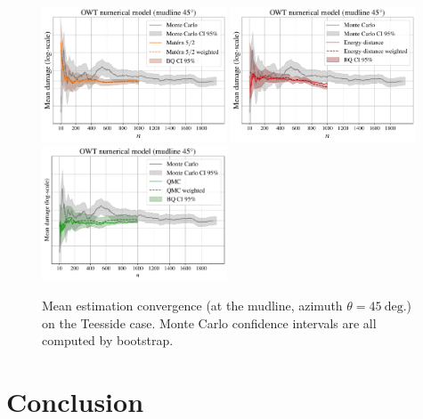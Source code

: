 \begin{figure}[!h]
\begin{center}
    \includegraphics[width=0.49\textwidth]{part2/figures/DCE/teesside/log_convergence_MaternNode1_45.pdf}
    \includegraphics[width=0.49\textwidth]{part2/figures/DCE/teesside/log_convergence_EnergyNode1_45.pdf}
    \includegraphics[width=0.49\textwidth]{part2/figures/DCE/teesside/log_convergence_QMCNode1_45.pdf}
\end{center}
\caption{Mean estimation convergence (at the mudline, azimuth $\theta=45~\mathrm{deg.}$) on the Teesside case. Monte Carlo confidence intervals are all computed by bootstrap.} 
\label{fig:convergence_teesside}
\end{figure}


\section{Conclusion}\label{sec:sec45}

